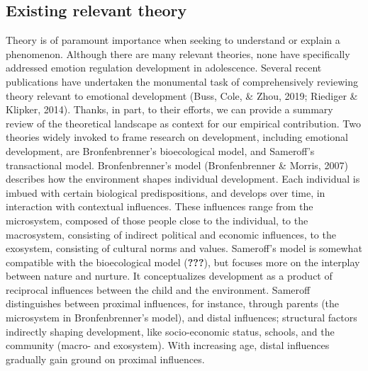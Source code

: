 \documentclass[
  english,
  man]{apa6}
\begin{document}
\hypertarget{existing-relevant-theory}{%
\subsection{Existing relevant theory}\label{existing-relevant-theory}}

Theory is of paramount importance when seeking to understand or explain a
phenomenon. Although there are many relevant theories, none have specifically
addressed emotion regulation development in adolescence. Several recent
publications have undertaken the monumental task of comprehensively reviewing
theory relevant to emotional development
(Buss, Cole, \& Zhou, 2019; Riediger \& Klipker, 2014). Thanks, in part, to their efforts,
we can provide a summary review of the theoretical landscape as context for our
empirical contribution.
Two theories widely invoked to frame research on development, including
emotional development, are Bronfenbrenner's bioecological model, and Sameroff's
transactional model. Bronfenbrenner's model
(Bronfenbrenner \& Morris, 2007) describes how the environment
shapes individual development. Each individual is imbued with certain
biological predispositions, and develops over time, in interaction with
contextual influences. These influences range from the microsystem, composed of
those people close to the individual, to the macrosystem, consisting of
indirect political and economic influences, to the exosystem, consisting of
cultural norms and values. Sameroff's model is somewhat compatible with the
bioecological model ({\textbf{???}}), but focuses more
on the interplay between nature and nurture. It conceptualizes development as a
product of reciprocal influences between the child and the environment.
Sameroff distinguishes between proximal influences, for instance, through
parents (the microsystem in Bronfenbrenner's model), and distal influences;
structural factors indirectly shaping development, like socio-economic status,
schools, and the community (macro- and exosystem). With increasing age, distal
influences gradually gain ground on proximal influences.
\end{document}
